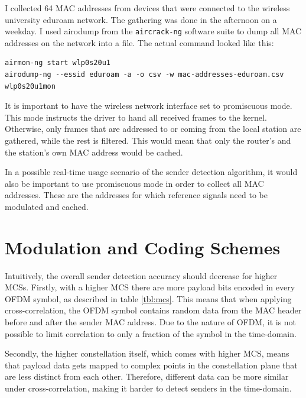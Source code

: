 I collected 64 MAC addresses from devices that were connected to the wireless university eduroam network. The gathering was done in the afternoon on a weekday. I used airodump from the \texttt{aircrack-ng} software suite to dump all MAC addresses on the network into a file. The actual command looked like this:

\begin{lstlisting}[captionpos=b,caption={Capture Real-World MAC Addresses},label=lst:airodump]
airmon-ng start wlp0s20u1
airodump-ng --essid eduroam -a -o csv -w mac-addresses-eduroam.csv wlp0s20u1mon
\end{lstlisting}

It is important to have the wireless network interface set to promiscuous mode. This mode instructs the driver to hand all received frames to the kernel. Otherwise, only frames that are addressed to or coming from the local station are gathered, while the rest is filtered. This would mean that only the router's and the station's own MAC address would be cached.

In a possible real-time usage scenario of the sender detection algorithm, it would also be important to use promiscuous mode in order to collect all MAC addresses. These are the addresses for which reference signals need to be modulated and cached.



\section{Modulation and Coding Schemes}

Intuitively, the overall sender detection accuracy should decrease for higher \glspl{MCS}. Firstly, with a higher \gls{MCS} there are more payload bits encoded in every \gls{OFDM} symbol, as described in table \ref{tbl:mcs}. This means that when applying cross-correlation, the \gls{OFDM} symbol contains random data from the MAC header before and after the sender MAC address. Due to the nature of \gls{OFDM}, it is not possible to limit correlation to only a fraction of the symbol in the time-domain.

Secondly, the higher constellation itself, which comes with higher \gls{MCS}, means that payload data gets mapped to complex points in the constellation plane that are less distinct from each other. Therefore, different data can be more similar under cross-correlation, making it harder to detect senders in the time-domain.\\


